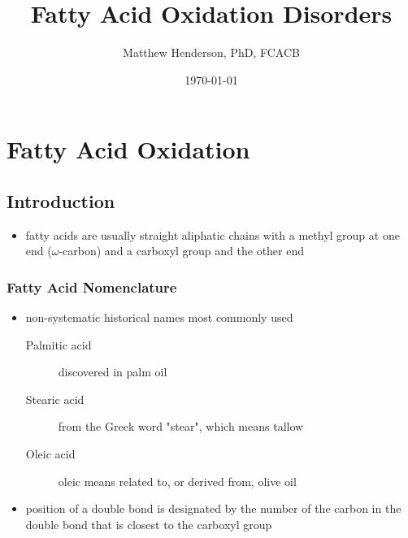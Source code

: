 \documentclass{scrartcl}
\author{Matthew Henderson, PhD, FCACB}
\date{\today}
\title{Fatty Acid Oxidation Disorders}
\begin{document}
\maketitle
\setcounter{tocdepth}{2}
\tableofcontents


\section{Fatty Acid Oxidation}
\label{sec:org3042910}
\subsection{Introduction}
\label{sec:org3464f69}
\begin{itemize}
\item fatty acids are usually straight aliphatic chains with a methyl
group at one end (\(\omega\)-carbon) and a carboxyl group and the other
end
\end{itemize}


\subsubsection{Fatty Acid Nomenclature}
\label{sec:orgb097c8c}
\begin{itemize}
\item non-systematic historical names most commonly used
\begin{description}
\item[{Palmitic acid}] discovered in palm oil
\item[{Stearic acid}] from the Greek word "stear", which means tallow
\item[{Oleic acid}] oleic means related to, or derived from, olive oil
\end{description}
\item position of a double bond is designated by the number of the carbon in the double bond that is closest to the carboxyl group
\end{itemize}
\end{document}
